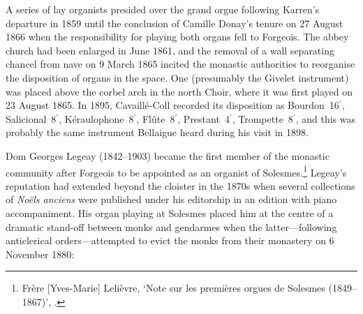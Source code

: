 A series of lay organists presided over the grand orgue following Karren's departure in 1859 until the conclusion of Camille Donay's tenure on 27 August 1866 when the responsibility for playing both organs fell to Forgeois.
The abbey church had been enlarged in June 1861, and the removal of a wall separating chancel from nave on 9 March 1865 incited the monastic authorities to reorganise the disposition of organs in the space.
One (presumably the Givelet instrument) was placed above the corbel arch in the north Choir, where it was first played on 23 August 1865.
In 1895, Cavaillé-Coll recorded its disposition as Bourdon~16$^\prime$, Salicional~8$^\prime$, Kéraulophone~8$^\prime$, Flûte~8$^\prime$, Prestant~4$^\prime$, Trompette~8$^\prime$, and this was probably the same instrument Bellaigue heard during his visit in 1898.

Dom Georges Legeay (1842--1903) became the first member of the monastic community after Forgeois to be appointed as an organist of Solesmes.\footnote{Frère [Yves-Marie] Lelièvre, `Note sur les premières orgues de Solesmes (1849--1867)', \so{}.}
Legeay's reputation had extended beyond the cloister in the 1870s when several collections of \emph{Noëls anciens} were published under his editorship in an edition with piano accompaniment.
His organ playing at Solesmes placed him at the centre of a dramatic stand-off between monks and gendarmes when the latter---following anticlerical orders---attempted to evict the monks from their monastery on 6 November 1880:


